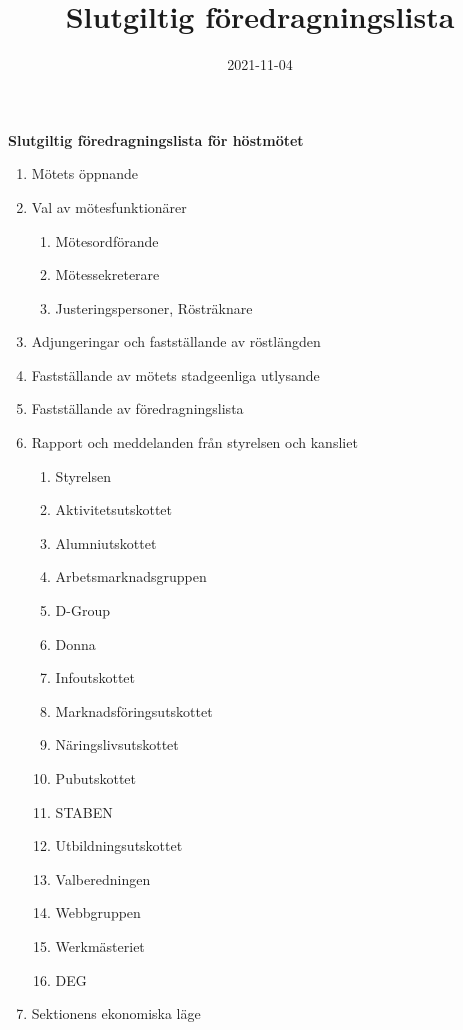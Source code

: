 \documentclass{datateknologsektionen-document}
\title{Slutgiltig föredragningslista}
\date{2021-11-04}
\begin{document}
\large
\begin{center}
  {\LARGE\bfseries Slutgiltig föredragningslista för höstmötet}
  \vspace{2mm}
\end{center}

\Large
\begin{enumerate}[topsep=0pt,itemsep=1ex]
  \item Mötets öppnande
  \item Val av mötesfunktionärer
        \begin{enumerate}[label*=\arabic*.,leftmargin=3em]
          \item Mötesordförande
          \item Mötessekreterare
          \item Justeringspersoner, Rösträknare
        \end{enumerate}
  \item Adjungeringar och fastställande av röstlängden
  \item Fastställande av mötets stadgeenliga utlysande
  \item Fastställande av föredragningslista
  \item Rapport och meddelanden från styrelsen och kansliet
        \begin{enumerate}[label*=\arabic*.,leftmargin=3em]
          \item Styrelsen
          \item Aktivitetsutskottet
          \item Alumniutskottet
          \item Arbetsmarknadsgruppen
          \item D-Group
          \item Donna
          \item Infoutskottet
          \item Marknadsföringsutskottet
          \item Näringslivsutskottet
          \item Pubutskottet
          \item STABEN
          \item Utbildningsutskottet
          \item Valberedningen
          \item Webbgruppen
          \item Werkmästeriet
          \item DEG
        \end{enumerate}
  \item Sektionens ekonomiska läge

\end{enumerate}
\end{document}
